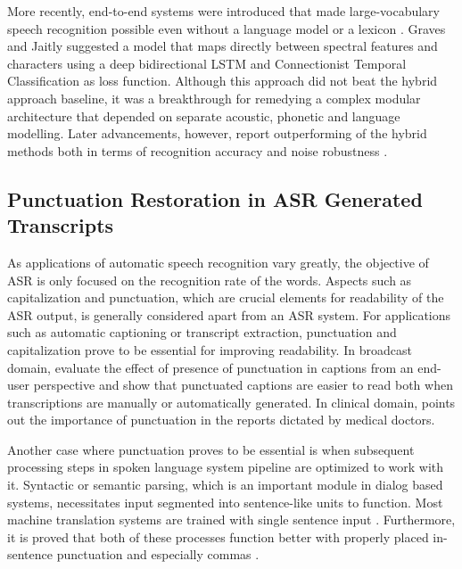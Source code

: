 More recently, end-to-end systems were introduced that made large-vocabulary speech recognition possible even without a language model or a lexicon \citep{e2e_asr}. Graves and Jaitly suggested a model that maps directly between spectral features and characters using a deep bidirectional LSTM and Connectionist Temporal Classification \citep{Graves:ctc} as loss function. Although this approach did not beat the hybrid approach baseline, it was a breakthrough for remedying a complex modular architecture that depended on separate acoustic, phonetic and language modelling. Later advancements, however, report outperforming of the hybrid methods both in terms of recognition accuracy and noise robustness \citep{deepspeech}.

\subsection{Punctuation Restoration in ASR Generated Transcripts}
\label{sota:punk_on_asr}

As applications of automatic speech recognition vary greatly, the objective of ASR is only focused on the recognition rate of the words. Aspects such as capitalization and punctuation, which are crucial elements for readability of the ASR output, is generally considered apart from an ASR system. For applications such as automatic captioning or transcript extraction, punctuation and capitalization prove to be essential for improving readability. In broadcast domain, \cite{Tundik2018} evaluate the effect of presence of punctuation in captions from an end-user perspective and show that punctuated captions are easier to read both when transcriptions are manually or automatically generated. In clinical domain, \cite{emrai} points out the importance of punctuation in the reports dictated by medical doctors. 

Another case where punctuation proves to be essential is when subsequent processing steps in spoken language system pipeline are optimized to work with it. Syntactic or semantic parsing, which is an important module in dialog based systems, necessitates input segmented into sentence-like units to function. Most machine translation systems are trained with single sentence input \citep{niehues2018}. Furthermore, it is proved that both of these processes function better with properly placed in-sentence punctuation and especially commas \citep{10045_76089, Jones:1994:ERP:991886.991960}. 

